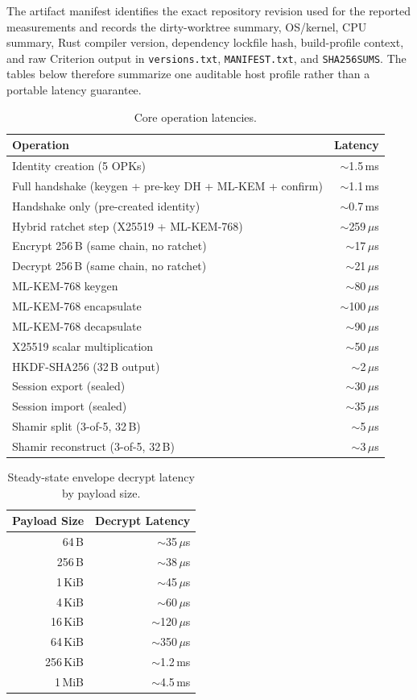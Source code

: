 \documentclass[preprint,12pt]{elsarticle}
\theoremstyle{definition}
\begin{document}
The artifact manifest identifies the exact repository revision used for the
reported measurements and records the dirty-worktree summary, OS/kernel, CPU
summary, Rust compiler version, dependency lockfile hash, build-profile context,
and raw Criterion output in
\texttt{versions.txt}, \texttt{MANIFEST.txt}, and \texttt{SHA256SUMS}. The
tables below therefore summarize one auditable host profile rather than a
portable latency guarantee.

\begin{table}[H]
\centering
\caption{Core operation latencies.}\label{tab:bench-core}
\small
\begin{tabular}{@{}lr@{}}
\toprule
Operation & Latency \\
\midrule
Identity creation (5 OPKs) & $\sim$1.5\,ms \\
Full handshake (keygen + pre-key DH + ML-KEM + confirm) & $\sim$1.1\,ms \\
Handshake only (pre-created identity) & $\sim$0.7\,ms \\
Hybrid ratchet step (X25519 + ML-KEM-768) & $\sim$259\,$\mu$s \\
Encrypt 256\,B (same chain, no ratchet) & $\sim$17\,$\mu$s \\
Decrypt 256\,B (same chain, no ratchet) & $\sim$21\,$\mu$s \\
\midrule
ML-KEM-768 keygen & $\sim$80\,$\mu$s \\
ML-KEM-768 encapsulate & $\sim$100\,$\mu$s \\
ML-KEM-768 decapsulate & $\sim$90\,$\mu$s \\
X25519 scalar multiplication & $\sim$50\,$\mu$s \\
HKDF-SHA256 (32\,B output) & $\sim$2\,$\mu$s \\
\midrule
Session export (sealed) & $\sim$30\,$\mu$s \\
Session import (sealed) & $\sim$35\,$\mu$s \\
Shamir split (3-of-5, 32\,B) & $\sim$5\,$\mu$s \\
Shamir reconstruct (3-of-5, 32\,B) & $\sim$3\,$\mu$s \\
\bottomrule
\end{tabular}
\end{table}

\begin{table}[H]
\centering
\caption{Steady-state envelope decrypt latency by payload size.}\label{tab:bench-payload}
\small
\begin{tabular}{@{}rr@{}}
\toprule
Payload Size & Decrypt Latency \\
\midrule
64\,B & $\sim$35\,$\mu$s \\
256\,B & $\sim$38\,$\mu$s \\
1\,KiB & $\sim$45\,$\mu$s \\
4\,KiB & $\sim$60\,$\mu$s \\
16\,KiB & $\sim$120\,$\mu$s \\
64\,KiB & $\sim$350\,$\mu$s \\
256\,KiB & $\sim$1.2\,ms \\
1\,MiB & $\sim$4.5\,ms \\
\bottomrule
\end{tabular}
\end{table}
\end{document}
